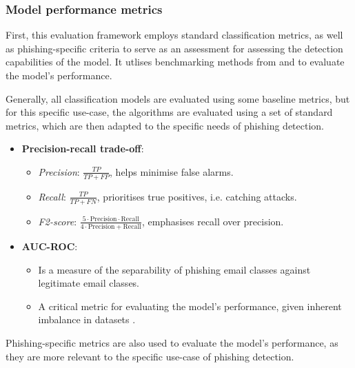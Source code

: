 
\subsubsection*{Model performance metrics}
First, this evaluation framework employs standard classification metrics, as well as phishing-specific criteria to serve as an assessment for assessing the detection capabilities of the model. It utlises benchmarking methods from \cite{kapoor2024comparative} and \cite{zamir2020phishing} to evaluate the model's performance.\newline

\noindent Generally, all classification models are evaluated using some baseline metrics, but for this specific use-case, the algorithms are evaluated using a set of standard metrics, which are then adapted to the specific needs of phishing detection.

\begin{itemize}
  \item \textbf{Precision-recall trade-off}:
  \begin{itemize}
    \item \textit{Precision}: $\frac{TP}{TP + FP}$, helps minimise false alarms.
    \item \textit{Recall}: $\frac{TP}{TP + FN}$, prioritises true positives, i.e. catching attacks.
    \item \textit{F2-score}: $\frac{5 \cdot \text{Precision} \cdot \text{Recall}}{4 \cdot \text{Precision} + \text{Recall}}$, emphasises recall over precision.
  \end{itemize}
  \item \textbf{AUC-ROC}:
  \begin{itemize}
    \item Is a measure of the separability of phishing email classes against legitimate email classes.
    \item A critical metric for evaluating the model's performance, given inherent imbalance in datasets \citep{ahmad2024across}.
  \end{itemize}
\end{itemize}

\noindent Phishing-specific metrics are also used to evaluate the model's performance, as they are more relevant to the specific use-case of phishing detection.

